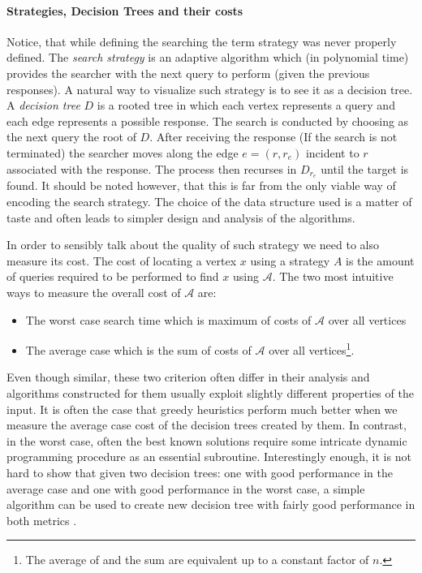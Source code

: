 \paragraph{Strategies, Decision Trees and their costs}
Notice, that while defining the searching the term strategy was never properly defined. The \textit{search strategy} is an adaptive algorithm which (in polynomial time) provides the searcher with the next query to perform (given the previous responses). A natural way to visualize such strategy is to see it as a decision tree. A \textit{decision tree} $D$ is a rooted tree in which each vertex represents a query and each edge represents a possible response. The search is conducted by choosing as the next query the root of $D$. After receiving the response (If the search is not terminated) the searcher moves along the edge $e=(r, r_e)$ incident to $r$ associated with the response. The process then recurses in $D_{r_e}$ until the target is found. It should be noted however, that this is far from the only viable way of encoding the search strategy. The choice of the data structure used is a matter of taste and often leads to simpler design and analysis of the algorithms.

In order to sensibly talk about the quality of such strategy we need to also measure its cost. The cost of locating a vertex $x$ using a strategy $A$ is the amount of queries required to be performed to find $x$ using $\mathcal{A}$. The two most intuitive ways to measure the overall cost of $\mathcal{A}$ are: 
\begin{itemize}
    \item The worst case search time which is maximum of costs of $\mathcal{A}$ over all vertices
    \item The average case which is the sum of costs of $\mathcal{A}$ over all vertices\footnote{The average of and the sum are equivalent up to a constant factor of $n$.}.
\end{itemize}

Even though similar, these two criterion often differ in their analysis and algorithms constructed for them usually exploit slightly different properties of the input. It is often the case that greedy heuristics perform much better when we measure the average case cost of the decision trees created by them. In contrast, in the worst case, often the best known solutions require some intricate dynamic programming procedure as an essential subroutine. Interestingly enough, it is not hard to show that given two decision trees: one with good performance in the average case and one with good performance in the worst case, a simple algorithm can be used to create new decision tree with fairly good performance in both metrics \cite{Tradingoff}.

